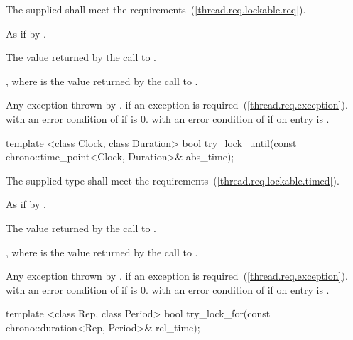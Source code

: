 \begin{itemdescr}
\pnum
\precondition The supplied  shall meet the 
requirements~(\ref{thread.req.lockable.req}).

\pnum
\effects As if by .

\pnum\returns The value returned by the call to .

\pnum
\postcondition {}, where  is the value returned by
the call to .

\pnum\throws
Any exception thrown by .  if an exception
is required~(\ref{thread.req.exception}).  with an error
condition of  if  is 0. 
with an error condition of  if on entry 
is .
\end{itemdescr}

%
%
\begin{itemdecl}
template <class Clock, class Duration>
  bool try_lock_until(const chrono::time_point<Clock, Duration>& abs_time);
\end{itemdecl}

\begin{itemdescr}
\pnum
\requires The supplied  type shall meet the 
requirements~(\ref{thread.req.lockable.timed}).

\pnum
\effects As if by .

\pnum
\returns The value returned by the call to .

\pnum
\postcondition {}, where  is the value returned by
the call to .

\pnum
\throws Any exception thrown by .  if an
exception is required~(\ref{thread.req.exception}).  with an error
condition of  if  is 0.  with an
error condition of  if on entry  is
.
\end{itemdescr}

%
%
\begin{itemdecl}
template <class Rep, class Period>
  bool try_lock_for(const chrono::duration<Rep, Period>& rel_time);
\end{itemdecl}

